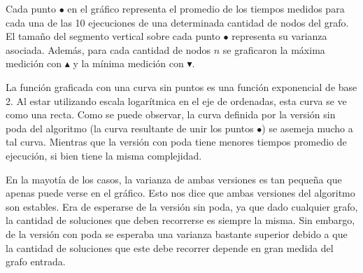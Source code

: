 \par{Cada punto $\bullet$ en el gráfico representa el promedio de los tiempos
medidos para cada una de las 10 ejecuciones de una determinada cantidad de nodos
del grafo. El tamaño del segmento vertical sobre cada punto $\bullet$ representa
su varianza asociada. Además, para cada cantidad de nodos $n$ se graficaron la
máxima medición con $\blacktriangle$ y la mínima medición con
$\blacktriangledown$.}\\

\par{La función graficada con una curva sin puntos es una función exponencial de
base 2. Al estar utilizando escala logarítmica en el eje de ordenadas, esta curva
se ve como una recta. Como se puede observar, la curva definida por la versión
sin poda del algoritmo (la curva resultante de unir los puntos $\bullet$) se
asemeja mucho a tal curva. Mientras que la versión con poda tiene
menores tiempos promedio de ejecución, si bien tiene la misma complejidad.}\\

\par{En la mayotía de los casos, la varianza de ambas versiones es tan pequeña
que apenas puede verse en el gráfico. Esto nos dice que ambas versiones del
algoritmo son estables. Era de esperarse de la versión sin poda, ya que dado
cualquier grafo, la cantidad de soluciones que deben recorrerse es siempre
la misma. Sin embargo, de la versión con poda se esperaba una varianza bastante
superior debido a que la cantidad de soluciones que este debe recorrer depende
en gran medida del grafo entrada.}
